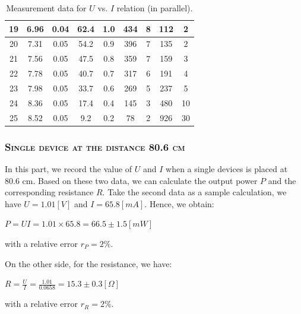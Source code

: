 \documentclass[a4paper,12pt]{article}
\begin{document}
\begin{table}[H]
\begin{center}
\begin{tabular}{|c|c|c|c|c|c|c|c|c|}
    19    & 6.96  & 0.04  & 62.4  & 1.0   & 434   & 8     & 112   & 2  \\ \hline
    20    & 7.31  & 0.05  & 54.2  & 0.9   & 396   & 7     & 135   & 2  \\ \hline
    21    & 7.56  & 0.05  & 47.5  & 0.8   & 359   & 7     & 159   & 3  \\ \hline
    22    & 7.78  & 0.05  & 40.7  & 0.7   & 317   & 6     & 191   & 4  \\ \hline
    23    & 7.98  & 0.05  & 33.7  & 0.6   & 269   & 5     & 237   & 5  \\ \hline
    24    & 8.36  & 0.05  & 17.4  & 0.4   & 145   & 3     & 480   & 10  \\ \hline
    25    & 8.52  & 0.05  & 9.2   & 0.2   & 78    & 2     & 926   & 30  \\ \hline
\end{tabular}
\caption{Measurement data for $U$ vs. $I$ relation (in parallel).}
\end{center}
\end{table}


\subsubsection{\textsc{Single device at the distance 80.6 cm}}
In this part, we record the value of $U$ and $I$ when a single devices is placed at 80.6 cm. Based on these two data, we can calculate the output power $P$ and the corresponding resistance $R$. Take the second data as a sample calculation, we have $U = 1.01 [V]$ and $I = 65.8 [mA]$. Hence, we obtain:
\begin{center}
$ P = UI = 1.01 \times 65.8 = 66.5 \pm 1.5 [mW] $
\end{center}
with a relative error $r_P = 2\%$.
\par On the other side, for the resistance, we have:
\begin{center}
$ \displaystyle R = \frac{U}{I} = \frac{1.01}{0.0658} = 15.3 \pm 0.3 [\Omega] $
\end{center}
with a relative error $r_R = 2\%$.
\end{document}
